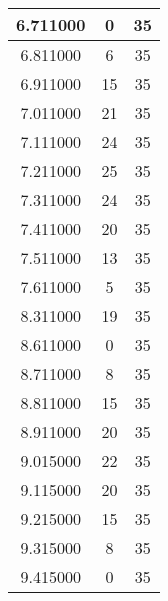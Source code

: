 \begin{longtable}[htbp]{|c|c|c|}
6.711000 & 0 & 35 \\ \hline
6.811000 & 6 & 35 \\ \hline
6.911000 & 15 & 35 \\ \hline
7.011000 & 21 & 35 \\ \hline
7.111000 & 24 & 35 \\ \hline
7.211000 & 25 & 35 \\ \hline
7.311000 & 24 & 35 \\ \hline
7.411000 & 20 & 35 \\ \hline
7.511000 & 13 & 35 \\ \hline
7.611000 & 5 & 35 \\ \hline
8.311000 & 19 & 35 \\ \hline
8.611000 & 0 & 35 \\ \hline
8.711000 & 8 & 35 \\ \hline
8.811000 & 15 & 35 \\ \hline
8.911000 & 20 & 35 \\ \hline
9.015000 & 22 & 35 \\ \hline
9.115000 & 20 & 35 \\ \hline
9.215000 & 15 & 35 \\ \hline
9.315000 & 8 & 35 \\ \hline
9.415000 & 0 & 35 \\ \hline
\end{longtable}
